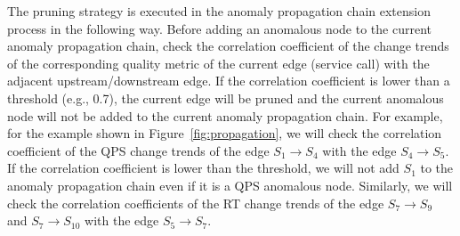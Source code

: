 The pruning strategy is executed in the anomaly propagation chain extension process in the following way.
Before adding an anomalous node to the current anomaly propagation chain, check the correlation coefficient of the change trends of the corresponding quality metric of the current edge (service call) with the adjacent upstream/downstream edge.
If the correlation coefficient is lower than a threshold (e.g., 0.7), the current edge will be pruned and the current anomalous node will not be added to the current anomaly propagation chain.
For example, for the example shown in Figure~\ref{fig:propagation}, we will check the correlation coefficient of the QPS change trends of the edge $S_1 \rightarrow S_4$ with the edge $S_4 \rightarrow S_5$.
If the correlation coefficient is lower than the threshold, we will not add $S_1$ to the anomaly propagation chain even if it is a QPS anomalous node.
Similarly, we will check the correlation coefficients of the RT change trends of the edge $S_7 \rightarrow S_9$ and $S_7 \rightarrow S_{10}$ with the edge $S_5 \rightarrow S_7$.




